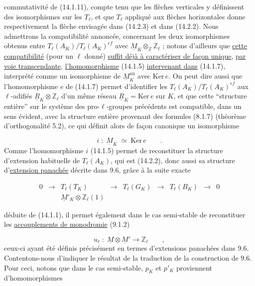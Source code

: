 commutativité de (14.1.11), compte tenu que les flèches verticales y définissent des isomorphismes sur les $T_\ell$, et que $T_\ell$ appliqué aux flèches horizontales donne respectivement la flèche envisagée dans (14.2.3) et dans (14.2.2). Nous admettrons la compatibilité annoncée, concernant les deux isomorphismes obtenus entre $T_\ell(A_K)/T_\ell(A_K)^{ef}$ avec $\underline{M}_K \otimes_{\mathbb{Z}} \mathbb{Z}_\ell$ ; notons d'ailleurs que \underline{cette compatibilité} (pour un $\ell$ donné) \underline{suffit déjà à caractériser de façon unique}, \underline{par voie transcendante}, \underline{l'homomorphisme} (14.1.5) \underline{intervenant dans} (14.1.7), interprété comme un isomorphisme de $\underline{M}_K^{\mathrm{an}}$ avec $\mathrm{Ker}\, e$. On peut dire aussi que l'homomorphisme $e$ de (14.1.7) permet d'identifier les $T_\ell(A_K)/T_\ell(A_K)^{ef}$ aux $\ell$-adifiés $\underline{R}_K \otimes \mathbb{Z}_\ell$ d'un même réseau $\underline{R}_K = \mathrm{Ker}\, e$ sur $K$, et que cette ``structure entière'' sur le système des pro-$\ell$-groupes précédents est compatible, dans un sens évident, avec la structure entière provenant des formules (8.1.7) (théorème d'orthogonalité 5.2), ce qui définit alors de façon canonique un isomorphisme

\begin{equation*}
i \;:\; \underline{M}_K \;\simeq\; \mathrm{Ker}\, e \qquad .
\end{equation*}
Comme l'homomorphisme $i$ (14.1.5) permet de reconstituer la structure d'extension habituelle de $T_\ell(A_K)$, qui est (14.2.2), donc aussi sa structure d'\underline{extension panachée} décrite dans 9.6, grâce à la suite exacte

\begin{equation*}
\begin{array}{ccccccccc}
0 & \longrightarrow & T_\ell(T_K) & \longrightarrow & T_\ell(G_K) & \longrightarrow & T_\ell(B_K) & \longrightarrow & 0 \\[5ex]
 & & \underline{M}'_K \otimes \mathbb{Z}_\ell(1) & & & & & &
\end{array}
\end{equation*}


déduite de (14.1.1), il permet également dans le cas semi-stable de reconstituer les \underline{accouplements de monodromie} (9.1.2)

\begin{equation}\tag{14.2.4}
u_\ell \;:\; \underline{M} \otimes \underline{M}' \longrightarrow \mathbb{Z}_\ell \qquad ,
\end{equation}
ceux-ci ayant été définis précisément en termes d'extensions panachées dans 9.6. Contentons-nous d'indiquer le résultat de la traduction de la construction de 9.6. Pour ceci, notons que dans le cas semi-stable, $p_K$ et $p'_K$ proviennent d'homomorphismes

